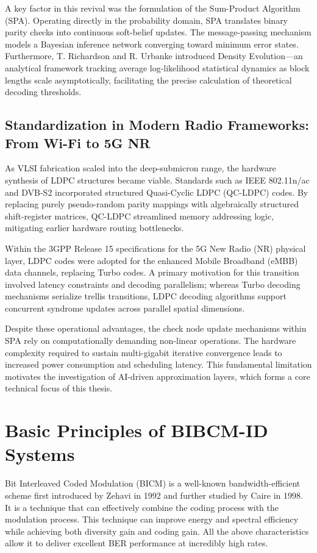 \documentclass[a4paper,14pt]{extreport}
\begin{document}
A key factor in this revival was the formulation of the Sum-Product Algorithm (SPA). Operating directly in the probability domain, SPA translates binary parity checks into continuous soft-belief updates. The message-passing mechanism models a Bayesian inference network converging toward minimum error states. Furthermore, T. Richardson and R. Urbanke introduced Density Evolution---an analytical framework tracking average log-likelihood statistical dynamics as block lengths scale asymptotically, facilitating the precise calculation of theoretical decoding thresholds.

\subsection{Standardization in Modern Radio Frameworks: From Wi-Fi to 5G NR}
As VLSI fabrication scaled into the deep-submicron range, the hardware synthesis of LDPC structures became viable. Standards such as IEEE 802.11n/ac and DVB-S2 incorporated structured Quasi-Cyclic LDPC (QC-LDPC) codes. By replacing purely pseudo-random parity mappings with algebraically structured shift-register matrices, QC-LDPC streamlined memory addressing logic, mitigating earlier hardware routing bottlenecks.

Within the 3GPP Release 15 specifications for the 5G New Radio (NR) physical layer, LDPC codes were adopted for the enhanced Mobile Broadband (eMBB) data channels, replacing Turbo codes. A primary motivation for this transition involved latency constraints and decoding parallelism; whereas Turbo decoding mechanisms serialize trellis transitions, LDPC decoding algorithms support concurrent syndrome updates across parallel spatial dimensions.

Despite these operational advantages, the check node update mechanisms within SPA rely on computationally demanding non-linear operations. The hardware complexity required to sustain multi-gigabit iterative convergence leads to increased power consumption and scheduling latency. This fundamental limitation motivates the investigation of AI-driven approximation layers, which forms a core technical focus of this thesis.

\section{Basic Principles of BIBCM-ID Systems}

Bit Interleaved Coded Modulation (BICM) is a well-known bandwidth-efficient scheme first introduced by Zehavi in 1992 and further studied by Caire in 1998. It is a technique that can effectively combine the coding process with the modulation process. This technique can improve energy and spectral efficiency while achieving both diversity gain and coding gain. All the above characteristics allow it to deliver excellent BER performance at incredibly high rates.
\end{document}
